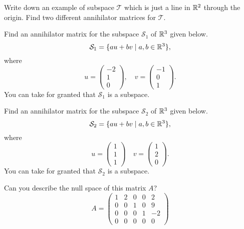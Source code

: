 \documentclass[elementsmain.tex]{subfiles}
\begin{document}
\begin{exercise}
Write down an example of subspace $\mathcal{T}$ which is just a line in $\mathbb{R}^2$ through the origin. Find two different annihilator matrices for $\mathcal{T}$.
\end{exercise}


\begin{exercise}
Find an annihilator matrix for the subspace $\mathcal{S}_1$ of $\mathbb{R}^3$ given below.
\[
\mathcal{S}_1 = \{ a u + b v \mid a,b \in \mathbb{R}^3 \},
\]
where
\[
u = \begin{pmatrix} -2\\1\\0 \end{pmatrix}, \quad 
v = \begin{pmatrix} -1 \\ 0 \\ 1 \end{pmatrix}.
\]
You can take for granted that $\mathcal{S}_1$ is a subspace.
\end{exercise}

\begin{exercise}
Find an annihilator matrix for the subspace $\mathcal{S}_2$ of $\mathbb{R}^3$ given below.
\[
\mathcal{S}_2 = \{ a u + b v \mid a,b \in \mathbb{R}^3 \},
\]
where
\[
u = \begin{pmatrix} 1\\1\\1 \end{pmatrix} \quad 
v = \begin{pmatrix} 1\\2\\0 \end{pmatrix}.
\]
You can take for granted that $\mathcal{S}_2$ is a subspace.
\end{exercise}



\begin{exercise}
Can you describe the null space of this matrix $A$?
\[
A = \begin{pmatrix} 1 & 2 & 0 & 0 & 2 \\ 0 & 0 & 1 & 0 & 9 \\
0 & 0 & 0 & 1 & -2 \\ 0 & 0 & 0 & 0 & 0 \end{pmatrix}
\]
\end{exercise}
\end{document}
